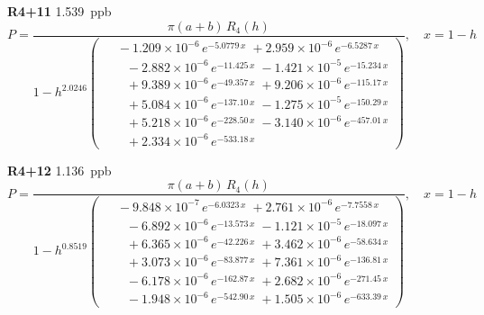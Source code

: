 \documentclass[12pt]{article}
\begin{document}
\noindent\textbf{R4+11} 1.539~ppb\nopagebreak
\begin{equation*}
P = \frac{\pi(a{+}b)\,R_4(h)}{1 - h^{2.0246}\!\left(\!\begin{aligned}
  &\; -1.209{\times}10^{-6}\,e^{-5.0779\,x} \; +2.959{\times}10^{-6}\,e^{-6.5287\,x} \\[-3pt]
  &\quad -2.882{\times}10^{-6}\,e^{-11.425\,x} \; -1.421{\times}10^{-5}\,e^{-15.234\,x} \\[-3pt]
  &\quad +9.389{\times}10^{-6}\,e^{-49.357\,x} \; +9.206{\times}10^{-6}\,e^{-115.17\,x} \\[-3pt]
  &\quad +5.084{\times}10^{-6}\,e^{-137.10\,x} \; -1.275{\times}10^{-5}\,e^{-150.29\,x} \\[-3pt]
  &\quad +5.218{\times}10^{-6}\,e^{-228.50\,x} \; -3.140{\times}10^{-6}\,e^{-457.01\,x} \\[-3pt]
  &\quad +2.334{\times}10^{-6}\,e^{-533.18\,x}
\end{aligned}\!\right)}, \quad x = 1{-}h
\end{equation*}

\noindent\textbf{R4+12} 1.136~ppb\nopagebreak
\begin{equation*}
P = \frac{\pi(a{+}b)\,R_4(h)}{1 - h^{0.8519}\!\left(\!\begin{aligned}
  &\; -9.848{\times}10^{-7}\,e^{-6.0323\,x} \; +2.761{\times}10^{-6}\,e^{-7.7558\,x} \\[-3pt]
  &\quad -6.892{\times}10^{-6}\,e^{-13.573\,x} \; -1.121{\times}10^{-5}\,e^{-18.097\,x} \\[-3pt]
  &\quad +6.365{\times}10^{-6}\,e^{-42.226\,x} \; +3.462{\times}10^{-6}\,e^{-58.634\,x} \\[-3pt]
  &\quad +3.073{\times}10^{-6}\,e^{-83.877\,x} \; +7.361{\times}10^{-6}\,e^{-136.81\,x} \\[-3pt]
  &\quad -6.178{\times}10^{-6}\,e^{-162.87\,x} \; +2.682{\times}10^{-6}\,e^{-271.45\,x} \\[-3pt]
  &\quad -1.948{\times}10^{-6}\,e^{-542.90\,x} \; +1.505{\times}10^{-6}\,e^{-633.39\,x}
\end{aligned}\!\right)}, \quad x = 1{-}h
\end{equation*}
\end{document}
